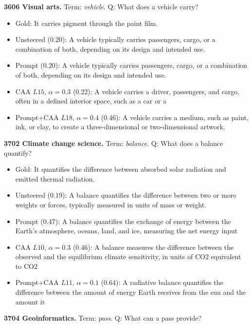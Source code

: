 \medskip\noindent\textbf{3606 Visual arts.} Term: \emph{vehicle}.
Q: What does a vehicle carry?
\begin{itemize}\setlength{\itemsep}{0.15em}\setlength{\parsep}{0pt}\setlength{\topsep}{0.2em}
\item Gold: It carries pigment through the paint film.
\item Unsteered (0.20): A vehicle typically carries passengers, cargo, or a combination of both, depending on its design and intended use.
\item Prompt (0.20): A vehicle typically carries passengers, cargo, or a combination of both, depending on its design and intended use.
\item CAA $L15$, $\alpha=0.3$ (0.22): A vehicle carries a driver, passengers, and cargo, often in a defined interior space, such as a car or a
\item Prompt+CAA $L18$, $\alpha=0.4$ (0.46): A vehicle carries a medium, such as paint, ink, or clay, to create a three-dimensional or two-dimensional artwork.
\end{itemize}
\medskip\noindent\textbf{3702 Climate change science.} Term: \emph{balance}.
Q: What does a balance quantify?
\begin{itemize}\setlength{\itemsep}{0.15em}\setlength{\parsep}{0pt}\setlength{\topsep}{0.2em}
\item Gold: It quantifies the difference between absorbed solar radiation and emitted thermal radiation.
\item Unsteered (0.19): A balance quantifies the difference between two or more weights or forces, typically measured in units of mass or weight.
\item Prompt (0.47): A balance quantifies the exchange of energy between the Earth's atmosphere, oceans, land, and ice, measuring the net energy input
\item CAA $L10$, $\alpha=0.3$ (0.46): A balance measures the difference between the observed and the equilibrium climate sensitivity, in units of CO2 equivalent to CO2
\item Prompt+CAA $L11$, $\alpha=0.1$ (0.64): A radiative balance quantifies the difference between the amount of energy Earth receives from the sun and the amount it
\end{itemize}
\medskip\noindent\textbf{3704 Geoinformatics.} Term: \emph{pass}.
Q: What can a pass provide?
